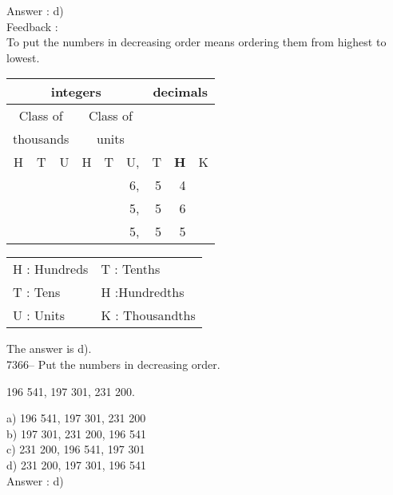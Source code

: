 \documentclass[letterpaper, 12pt]{article}
\begin{document}
Answer : d)\\

Feedback :\\
To put the numbers in decreasing order means ordering them from highest to lowest.\\
\begin{center}
\begin{tabular}{|rrr|rrr|rrr|}
\hline
\multicolumn{6}{|c|}{integers} &\multicolumn{3}{|c|}{decimals} \\
\hline
\multicolumn{3}{|c|}{Class of} &\multicolumn{3}{|c|}{Class of} &  \multicolumn{3}{c|}{} \\
\multicolumn{3}{|c|}{thousands} &\multicolumn{3}{|c|}{units} &  \multicolumn{3}{c|}{} \\
\hline
H & T & U &H & T & U, & T\up{th} & \textbf{H\up{th}} & K\up{th} \\
\hline
\hline
& & &  &  & 6, & 5 & 4 &\\
& & &  &  & 5, & 5 & 6 &\\
& & &  &  & 5, & 5 & 5 &\\
\hline
\end{tabular}
\end{center}

\scriptsize
\begin{center}
\begin{tabular}{ll}
H : Hundreds & T\up{th} : Tenths\\
T : Tens & H\up{th} :Hundredths\\
U : Units & K\up{e} : Thousandths\\
\end{tabular}
\end{center}

\normalsize
The answer is d).\\


7366-- Put the numbers in decreasing order.\\ 
\begin{center}
196 541, 197 301, 231 200.\\
\end{center}

a) 196 541, 197 301, 231 200\\
b) 197 301, 231 200, 196 541\\
c) 231 200, 196 541, 197 301\\
d) 231 200, 197 301, 196 541\\

Answer : d)\\
\end{document}

